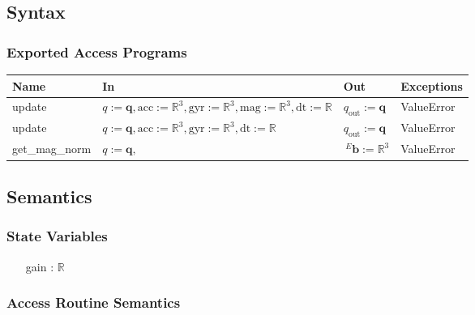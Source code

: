 \documentclass[12pt, titlepage]{article}
\begin{document}
\subsection{Syntax}

\subsubsection{Exported Access Programs}

\begin{center}
\begin{tabular}{p{2.5cm} p{6cm} p{2cm} p{1.5cm}}
\hline
\textbf{Name} & \textbf{In} & \textbf{Out} & \textbf{Exceptions} \\
\hline
update & $q:=\mathbf{q}, \text{acc}:=\mathbb{R}^3, \text{gyr}:=\mathbb{R}^3, \text{mag}:=\mathbb{R}^3, \text{dt}:=\mathbb{R}$ & $q_\text{out}:=\mathbf{q}$ & ValueError \\
update & $q:=\mathbf{q}, \text{acc}:=\mathbb{R}^3, \text{gyr}:=\mathbb{R}^3, \text{dt}:=\mathbb{R}$ & $q_\text{out}:=\mathbf{q}$ & ValueError \\
get\_mag\_norm & $q:=\mathbf{q}, $ & $\,^E\mathbf{b}:=\mathbb{R}^3$ & ValueError \\
\hline
\end{tabular}
\end{center}

\subsection{Semantics}

\subsubsection{State Variables}
\begin{itemize}
  \item[gain] : $\mathbb{R}$
\end{itemize}

\subsubsection{Access Routine Semantics}
\end{document}
